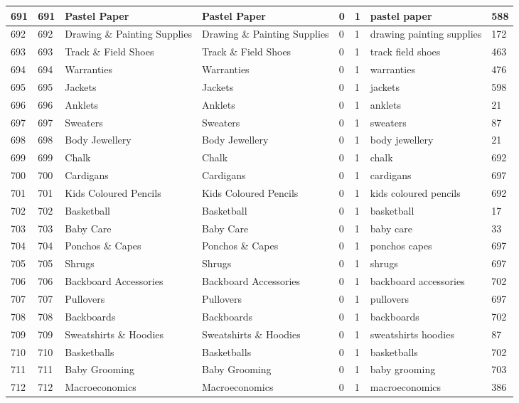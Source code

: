 \begin{longtable}{|l|l|l|l|l|l|l|l|}
691 & 691 & Pastel Paper & Pastel Paper & 0 & 1 & pastel paper & 588 \\ \hline 
692 & 692 & Drawing \& Painting Supplies & Drawing \& Painting Supplies & 0 & 1 & drawing painting supplies & 172 \\ \hline 
693 & 693 & Track \& Field Shoes & Track \& Field Shoes & 0 & 1 & track field shoes & 463 \\ \hline 
694 & 694 & Warranties & Warranties & 0 & 1 & warranties & 476 \\ \hline 
695 & 695 & Jackets & Jackets & 0 & 1 & jackets & 598 \\ \hline 
696 & 696 & Anklets & Anklets & 0 & 1 & anklets & 21 \\ \hline 
697 & 697 & Sweaters & Sweaters & 0 & 1 & sweaters & 87 \\ \hline 
698 & 698 & Body Jewellery & Body Jewellery & 0 & 1 & body jewellery & 21 \\ \hline 
699 & 699 & Chalk & Chalk & 0 & 1 & chalk & 692 \\ \hline 
700 & 700 & Cardigans & Cardigans & 0 & 1 & cardigans & 697 \\ \hline 
701 & 701 & Kids Coloured Pencils & Kids Coloured Pencils & 0 & 1 & kids coloured pencils & 692 \\ \hline 
702 & 702 & Basketball & Basketball & 0 & 1 & basketball & 17 \\ \hline 
703 & 703 & Baby Care & Baby Care & 0 & 1 & baby care & 33 \\ \hline 
704 & 704 & Ponchos \& Capes & Ponchos \& Capes & 0 & 1 & ponchos capes & 697 \\ \hline 
705 & 705 & Shrugs & Shrugs & 0 & 1 & shrugs & 697 \\ \hline 
706 & 706 & Backboard Accessories & Backboard Accessories & 0 & 1 & backboard accessories & 702 \\ \hline 
707 & 707 & Pullovers & Pullovers & 0 & 1 & pullovers & 697 \\ \hline 
708 & 708 & Backboards & Backboards & 0 & 1 & backboards & 702 \\ \hline 
709 & 709 & Sweatshirts \& Hoodies & Sweatshirts \& Hoodies & 0 & 1 & sweatshirts hoodies & 87 \\ \hline 
710 & 710 & Basketballs & Basketballs & 0 & 1 & basketballs & 702 \\ \hline 
711 & 711 & Baby Grooming & Baby Grooming & 0 & 1 & baby grooming & 703 \\ \hline 
712 & 712 & Macroeconomics & Macroeconomics & 0 & 1 & macroeconomics & 386 \\ \hline 

\end{longtable}
